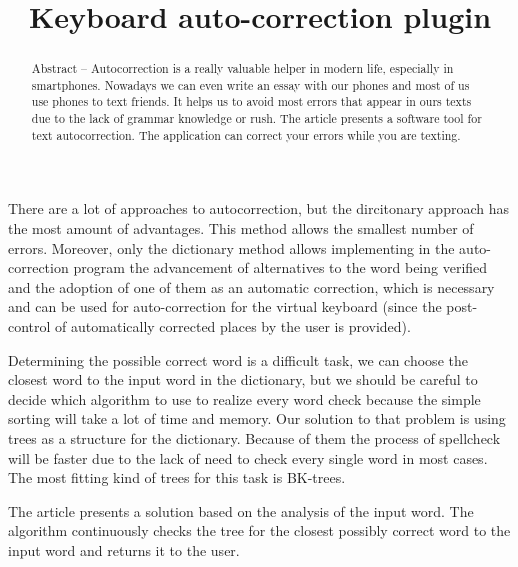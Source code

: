 \documentclass[conference]{IEEEtran}
\begin{document}
\title{	Keyboard auto-correction plugin}
\date{}%

\author{
}
\maketitle

\begin{abstract}
Abstract – Autocorrection is a really valuable helper in modern life, especially in smartphones. Nowadays we can even write an essay with our phones and most of us use phones to text friends. It helps us to avoid most errors that appear in ours texts due to the lack of grammar knowledge or rush.
The article presents a software tool for text autocorrection. The application can correct your errors while you are texting. 
\end{abstract}

\medskip
There are a lot of approaches to autocorrection, but the dircitonary approach has the most amount of advantages. This method allows the smallest number of errors. Moreover, only the dictionary method allows implementing in the auto-correction program the advancement of alternatives to the word being verified and the adoption of one of them as an automatic correction, which is necessary and can be used for auto-correction for the virtual keyboard (since the post-control of automatically corrected places by the user is provided).

Determining the possible correct word is a difficult task, we can choose the closest word to the input word in the dictionary, but we should be careful to decide which algorithm to use to realize every word check because the simple sorting will take a lot of time and memory. Our solution to that problem is using trees as a structure for the dictionary. Because of them the process of spellcheck will be faster due to the 
lack of need to check every single word in most cases. The most fitting kind of trees for this task is BK-trees.

The article presents a solution based on the analysis of the input word.
The algorithm continuously checks the tree for the closest possibly correct word to the input word and returns it to the user.
\end{document}
